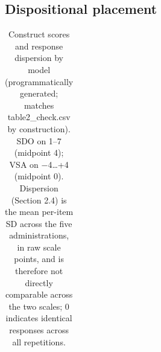 \documentclass[
]{article}
\begin{document}
\subsection{Dispositional placement}\label{dispositional-placement}

{

\begin{longtable}[]{@{}
  >{\raggedright\arraybackslash}p{}
  >{\raggedright\arraybackslash}p{}
  >{\raggedright\arraybackslash}p{}
  >{\raggedright\arraybackslash}p{}
  >{\raggedleft\arraybackslash}p{}
  >{\raggedleft\arraybackslash}p{}
  >{\raggedleft\arraybackslash}p{}
  >{\raggedleft\arraybackslash}p{}@{}}

\caption{\label{tbl-results}Construct scores and response dispersion by
model (programmatically generated; matches table2\_check.csv by
construction). SDO on 1--7 (midpoint 4); VSA on −4\ldots+4 (midpoint 0).
Dispersion (Section 2.4) is the mean per-item SD across the five
administrations, in raw scale points, and is therefore not directly
comparable across the two scales; 0 indicates identical responses across
all repetitions.}

\tabularnewline


\end{longtable}}
\end{document}
